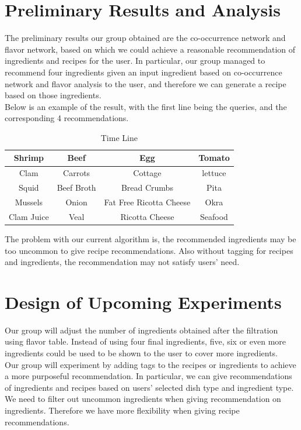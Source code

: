\documentclass[sigconf]{acmart}
\begin{document}
\section{Preliminary Results and Analysis}
The preliminary results our group obtained are the co-occurrence network and flavor network, based on which we could achieve a reasonable recommendation of ingredients and recipes for the user. In particular, our group managed to recommend four ingredients given an input ingredient based on co-occurrence network and flavor analysis to the user, and therefore we can generate a recipe based on those ingredients.\cite{restle1955theory}\\
\indent Below is an example of the result, with the first line being the queries, and the corresponding 4 recommendations. 

\begin{table}[H]
\begin{center}
\begin{tabular}{ c c c c}
Shrimp&Beef&Egg&Tomato\\
\hline
Clam&Carrots&Cottage&lettuce\\
Squid&Beef Broth&Bread Crumbs&Pita\\
Mussels&Onion&Fat Free Ricotta Cheese&Okra\\
Clam Juice&Veal&Ricotta Cheese&Seafood\\
\end{tabular}
\caption{Time Line}
\end{center}
\end{table}

The problem with our current algorithm is, the recommended ingredients may be too uncommon to give recipe recommendations. Also without tagging for recipes and ingredients, the recommendation may not satisfy users’ need.\\


\section{Design of Upcoming Experiments}
Our group will adjust the number of ingredients obtained after the filtration using flavor table. Instead of using four final ingredients, five, six or even more ingredients could be used to be shown to the user to cover more ingredients.\\
\indent Our group will experiment by adding tags to the recipes or ingredients to achieve a more purposeful recommendation. In particular,  we can give recommendations of ingredients and recipes based on users’ selected dish type and ingredient type.\\
\indent We need to filter out uncommon ingredients when giving recommendation on ingredients. Therefore we have more flexibility when giving recipe recommendations.\\ 
\end{document}
